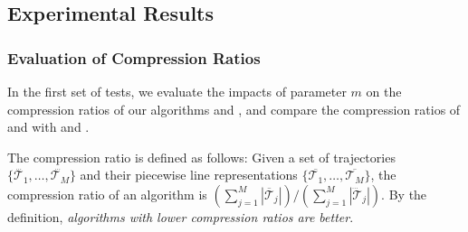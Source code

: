 \subsection{Experimental Results}


\subsubsection{Evaluation of Compression Ratios}


In the first set of tests, we evaluate the impacts of parameter $m$ on the compression ratios of our algorithms \cist and \cista, and compare the compression ratios of \cist and \cista with \dps and \squishe.

The compression ratio is defined as follows: Given a set of trajectories $\{\dddot{\mathcal{T}_1}, \ldots, \dddot{\mathcal{T}_M}\}$ and their piecewise line representations $\{\overline{\mathcal{T}_1}, \ldots, \overline{\mathcal{T}_M}\}$, the compression ratio of an algorithm is $(\sum_{j=1}^{M} |\overline{\mathcal{T}}_j |)/(\sum_{j=1}^{M} |\dddot{\mathcal{T}}_j |)$.
By the definition, \emph{algorithms with lower compression ratios are better}.







